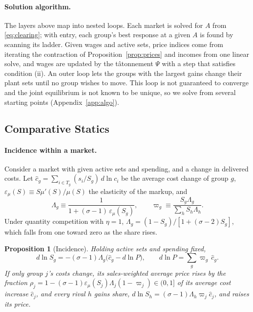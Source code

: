 \documentclass[11pt]{article}
\newtheorem{proposition}{Proposition}
\theoremstyle{definition}
\theoremstyle{remark}
\begin{document}
\paragraph{Solution algorithm.} The layers above map into nested loops. Each market
is solved for $A$ from \eqref{eq:clearing}; with entry, each group's best response at a
given $A$ is found by scanning its ladder. Given wages and active sets, price indices
come from iterating the contraction of Proposition~\ref{prop:prices} and incomes from
one linear solve, and wages are updated by the tâtonnement $\Psi$ with a step that
satisfies condition (ii). An outer loop lets the groups with the largest gains change
their plant sets until no group wishes to move. This loop is not guaranteed to converge
and the joint equilibrium is not known to be unique, so we solve from several starting
points (Appendix~\ref{app:algo}).

\subsection{Comparative Statics}
\label{sec:cs}

\paragraph{Incidence within a market.} Consider a market with given active sets and
spending, and a change in delivered costs. Let $\hat c_g=\sum_{i\in T_g}(s_i/S_g)\,
d\ln c_i$ be the average cost change of group $g$, $\varepsilon_\mu(S)\equiv
S\mu'(S)/\mu(S)$ the elasticity of the markup, and
\begin{equation}
  \Lambda_g\equiv\frac{1}{1+(\sigma-1)\,\varepsilon_\mu(S_g)},
  \qquad
  \varpi_g\equiv\frac{S_g\Lambda_g}{\sum_h S_h\Lambda_h}.
  \label{eq:incidenceweights}
\end{equation}
Under quantity competition with $\eta=1$, $\Lambda_g=(1-S_g)/[1+(\sigma-2)S_g]$, which
falls from one toward zero as the share rises.

\begin{proposition}[Incidence]\label{prop:incidence}
Holding active sets and spending fixed,
\begin{equation}
  d\ln S_g=-(\sigma-1)\Lambda_g\bigl(\hat c_g-d\ln P\bigr),
  \qquad
  d\ln P=\sum_g\varpi_g\,\hat c_g .
  \label{eq:incidence}
\end{equation}
If only group $j$'s costs change, its sales-weighted average price rises by the fraction
$\rho_j=1-(\sigma-1)\varepsilon_\mu(S_j)\Lambda_j(1-\varpi_j)\in(0,1]$ of its average
cost increase $\hat c_j$, and every rival $h$ gains share,
$d\ln S_h=(\sigma-1)\Lambda_h\varpi_j\hat c_j$, and raises its price.
\end{proposition}
\end{document}
